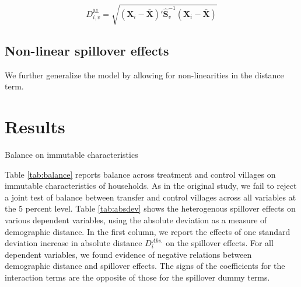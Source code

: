 \documentclass[11pt]{article}
\begin{document}
            \begin{equation} \label{eq:mdist}
            D^\text{M.}_{i,v} = \sqrt{(\mathbf X_i - \mathbf{\bar X})' \mathbf{\hat S}^{-1}_v (\mathbf X_i - \mathbf{\bar X})}
            \end{equation}

    \subsection{Non-linear spillover effects}

        We further generalize the model by allowing for non-linearities in the distance term.

\section{Results}

    \begin{table}[H]
    \centering
    \caption{Balance on immutable characteristics}
    \label{tab:balance}
    \end{table}

    Table \ref{tab:balance} reports balance across treatment and control villages on immutable characteristics of households. As in the original study, we fail to reject a joint test of balance between transfer and control villages across all variables at the 5 percent level. Table \ref{tab:absdev} shows the heterogenous spillover effects on various dependent variables, using the absolute deviation as a measure of demographic distance. In the first column, we report the effects of one standard deviation increase in absolute distance  $D_i^{Abs.}$ on the spillover effects. For all dependent variables, we found evidence of negative relations between demographic distance and spillover effects. The signs of the coefficients for the interaction terms are the opposite of those for the spillover dummy terms. \\
\end{document}
